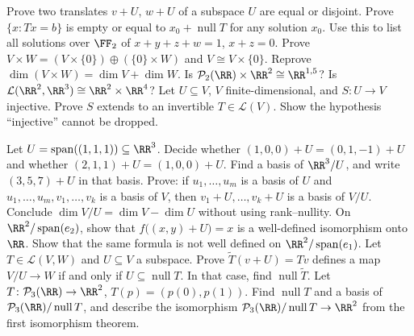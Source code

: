 \documentclass[11pt]{scrartcl}
\DeclareMathOperator{\nul}{null}
\DeclareMathOperator{\spn}{span}
\newcommand{\LL}{\mathcal L}
\newcommand{\PP}{\mathcal P}
\begin{document}
\begin{problem}
  \leavevmode
  \begin{enumerate}[(a)]
    \ii Prove two translates $v+U$, $w+U$ of a subspace $U$ are equal or disjoint.
    \ii Prove $\{x:Tx=b\}$ is empty or equal to $x_0+\nul T$ for any solution $x_0$.
    Use this to list all solutions over $\FF_2$ of $x+y+z+w=1$, $x+z=0$.
    \ii Prove $V\times W=(V\times\{0\})\oplus(\{0\}\times W)$ and $V\cong V\times\{0\}$.
    Reprove $\dim(V\times W)=\dim V+\dim W$.
    \ii Is $\PP_2(\RR)\times\RR^2\cong\RR^{1,5}$? Is $\LL(\RR^2,\RR^3)\cong\RR^2\times\RR^4$?
    \ii Let $U\subseteq V$, $V$ finite-dimensional, and $S\colon U\to V$ injective.
    Prove $S$ extends to an invertible $T\in\LL(V)$.
    Show the hypothesis ``injective'' cannot be dropped.
  \end{enumerate}
\end{problem}

\begin{problem}
  \leavevmode
  \begin{enumerate}[(a)]
    \ii Let $U=\spn((1,1,1))\subseteq\RR^3$.
    Decide whether $(1,0,0)+U=(0,1,-1)+U$ and whether $(2,1,1)+U=(1,0,0)+U$.
    Find a basis of $\RR^3/U$, and write $(3,5,7)+U$ in that basis.
    \ii Prove: if $u_1,\dots,u_m$ is a basis of $U$ and $u_1,\dots,u_m,v_1,\dots,v_k$ is a basis of $V$, then $v_1+U,\dots,v_k+U$ is a basis of $V/U$.
    Conclude $\dim V/U=\dim V-\dim U$ without using rank--nullity.
    \ii On $\RR^2/\spn(e_2)$, show that $f\big((x,y)+U\big)=x$ is a well-defined isomorphism onto $\RR$.
    Show that the same formula is not well defined on $\RR^2/\spn(e_1)$.
    \ii Let $T\in\LL(V,W)$ and $U\subseteq V$ a subspace.
    Prove $\tilde T(v+U)=Tv$ defines a map $V/U\to W$ if and only if $U\subseteq\nul T$.
    In that case, find $\nul\tilde T$.
    \ii Let $T\colon\PP_3(\RR)\to\RR^2$, $T(p)=(p(0),p(1))$.
    Find $\nul T$ and a basis of $\PP_3(\RR)/\nul T$, and describe the isomorphism $\PP_3(\RR)/\nul T\to\RR^2$ from the first isomorphism theorem.
  \end{enumerate}
\end{problem}
\end{document}
